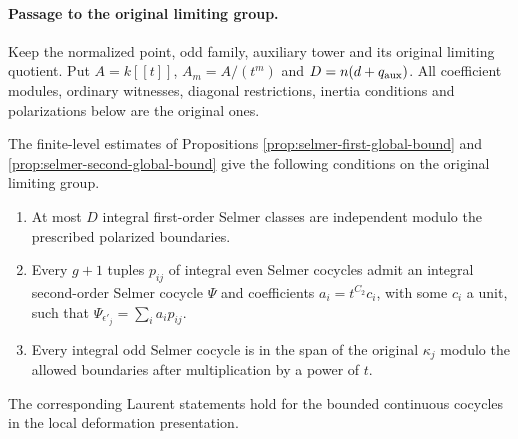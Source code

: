 \paragraph{Passage to the original limiting group.}
Keep the normalized point, odd family, auxiliary tower and its original
limiting quotient. Put $A=k[[t]]$, $A_m=A/(t^m)$ and
$D=n(d+q_{\rm aux})$. All coefficient modules, ordinary witnesses,
diagonal restrictions, inertia conditions and polarizations below are
the original ones.

\begin{proposition}
\label{prop:selmer-limit-comparison}
The finite-level estimates of Propositions
\ref{prop:selmer-first-global-bound} and
\ref{prop:selmer-second-global-bound} give the following conditions on
the original limiting group.
\begin{enumerate}
\item At most $D$ integral first-order Selmer classes are independent
modulo the prescribed polarized boundaries.
\item Every $g+1$ tuples $p_{ij}$ of integral even Selmer cocycles admit
an integral second-order Selmer cocycle $\Psi$ and coefficients
$a_i=t^{C_2}c_i$, with some $c_i$ a unit, such that
$\Psi_{\epsilon'_j}=\sum_i a_i p_{ij}$.
\item Every integral odd Selmer cocycle is in the span of the original
$\kappa_j$ modulo the allowed boundaries after multiplication by a
power of $t$.
\end{enumerate}
The corresponding Laurent statements hold for the bounded continuous
cocycles in the local deformation presentation.
\end{proposition}

